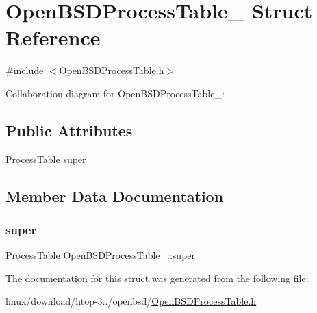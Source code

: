 \hypertarget{structOpenBSDProcessTable__}{}\section{Open\+B\+S\+D\+Process\+Table\+\_\+ Struct Reference}
\label{structOpenBSDProcessTable__}


{\ttfamily \#include $<$Open\+B\+S\+D\+Process\+Table.\+h$>$}



Collaboration diagram for Open\+B\+S\+D\+Process\+Table\+\_\+\+:
\subsection*{Public Attributes}
\begin{DoxyCompactItemize}
\item 
\hyperlink{ProcessTable_8h_a54ec62da6f9d80d4d06e3845a2597a80}{Process\+Table} \hyperlink{structOpenBSDProcessTable___aa687d90377f70110d478ec124fce73f4}{super}
\end{DoxyCompactItemize}


\subsection{Member Data Documentation}
\mbox{\label{structOpenBSDProcessTable___aa687d90377f70110d478ec124fce73f4}} 
\subsubsection{\texorpdfstring{super}{super}}
{\footnotesize\ttfamily \hyperlink{ProcessTable_8h_a54ec62da6f9d80d4d06e3845a2597a80}{Process\+Table} Open\+B\+S\+D\+Process\+Table\+\_\+\+::super}



The documentation for this struct was generated from the following file\+:\begin{DoxyCompactItemize}
\item 
linux/download/htop-\/3../openbsd/\hyperlink{OpenBSDProcessTable_8h}{Open\+B\+S\+D\+Process\+Table.\+h}\end{DoxyCompactItemize}
